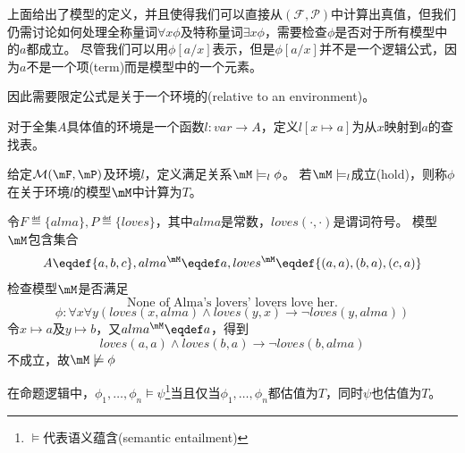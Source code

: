 上面给出了模型的定义，并且使得我们可以直接从$(\mathcal{F},\mathcal{P})$中计算出真值，但我们仍需讨论如何处理全称量词$\forall x\phi$及特称量词$\exists x\phi$，需要检查$\phi$是否对于所有模型中的$a$都成立。
尽管我们可以用$\phi[a/x]$表示，但是$\phi[a/x]$并不是一个逻辑公式，因为$a$不是一个项(term)而是模型中的一个元素。

因此需要限定公式是关于一个环境的(relative to an environment)。
\begin{definition}
对于全集$A$具体值的环境是一个函数$l:var\to A$，定义$l[x\mapsto a]$为从$x$映射到$a$的查找表。
\end{definition}

\begin{definition}
给定$\mathcal{M}(\mF,\mP)$及环境$l$，定义满足关系$\mM\models_l\phi$。
若$\mM\models_l$成立(hold)，则称$\phi$在关于环境$l$的模型$\mM$中计算为$T$。
\end{definition}

\begin{example}
令$F\eqdef\{alma\},P\eqdef\{loves\}$，其中$alma$是常数，$loves(\cdot,\cdot)$是谓词符号。
模型$\mM$包含集合
\[A\eqdef\{a,b,c\},alma^\mM\eqdef a,loves^\mM\eqdef\{(a,a),(b,a),(c,a)\}\]
检查模型$\mM$是否满足
\[\text{None of Alma's lovers' lovers love her.}\]
\[\phi:\forall x\forall y(loves(x,alma)\land loves(y,x)\to\lnot loves(y,alma))\]
令$x\mapsto a$及$y\mapsto b$，又$alma^{\mM}\eqdef a$，得到
\[loves(a,a)\land loves(b,a)\to\lnot loves(b,alma)\]
不成立，故$\mM\not\models\phi$
\end{example}

在命题逻辑中，$\phi_1,\ldots,\phi_n\models\psi$\footnote{$\models$代表语义蕴含(semantic entailment)}当且仅当$\phi_1,\ldots,\phi_n$都估值为$T$，同时$\psi$也估值为$T$。

